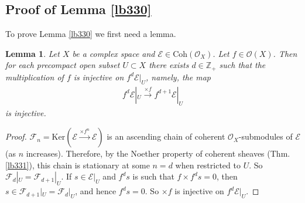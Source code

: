 \documentclass[12pt,b5paper,notitlepage]{report}
\theoremstyle{definition}
\theoremstyle{plain}
\newtheorem{lm}[df]{Lemma}
\newcommand{\scr}{\mathscr}
\newcommand{\Zbb}{\mathbb Z}
\newcommand{\Ker}{\mathrm{Ker}}
\newcommand{\mk}{\mathfrak m}
\newcommand{\Coh}{\mathrm{Coh}}
\numberwithin{equation}{section}
\begin{document}



\subsection{Proof of Lemma \ref{lb330}}


To prove Lemma \ref{lb330} we first need a lemma.

\begin{lm}\label{lb332}
Let $X$ be a complex space and $\scr E\in\Coh(\scr O_X)$. Let $f\in\scr O(X)$. Then for each precompact open subset $U\subset X$ there exists $d\in\Zbb_+$ such that the multiplication of $f$ is injective on $f^d\scr E|_U$, namely, the map
\begin{align*}
f^d\scr E|_U\xrightarrow{\times f}f^{d+1}\scr E|_U
\end{align*}
is injective.
\end{lm} 


\begin{proof}
$\scr F_n=\Ker(\scr E\xrightarrow{\times f^n}\scr E)$ is an ascending chain of coherent $\scr O_X$-submodules of $\scr E$ (as $n$ increases). Therefore, by the Noether property of coherent sheaves (Thm. \ref{lb331}), this chain is stationary at some $n=d$ when restricted to $U$. So $\scr F_d|_U=\scr F_{d+1}|_U$. If $s\in\scr E|_U$ and $f^ds$ is such that $f\times f^ds=0$, then $s\in\scr F_{d+1}|_U=\scr F_d|_U$, and hence $f^ds=0$. So $\times f$ is injective on $f^d\scr E|_U$.
\end{proof}
\end{document}
